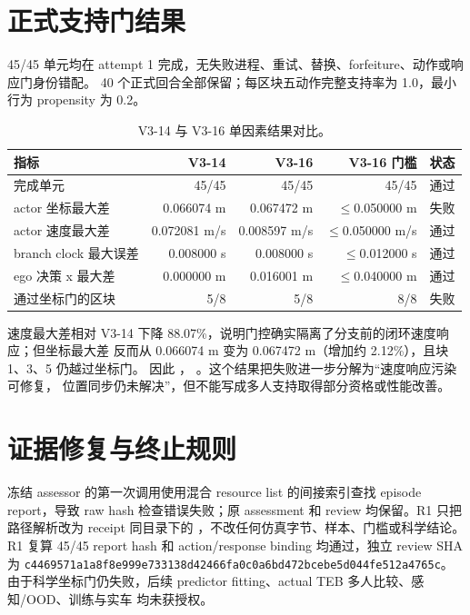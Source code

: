 \documentclass[12pt,a4paper,oneside]{report}
\newcommand{\ok}{\textcolor{vgreen}{通过}}
\newcommand{\fail}{\textcolor{vred}{失败}}
\newcommand{\hashbreak}[4]{\texttt{\footnotesize #1\allowbreak#2\allowbreak#3\allowbreak#4}}
\begin{document}
\section{正式支持门结果}
45/45 单元均在 attempt 1 完成，无失败进程、重试、替换、forfeiture、动作或响应门身份错配。
40 个正式回合全部保留；每区块五动作完整支持率为 1.0，最小行为 propensity 为 0.2。

\begin{table}[htbp]
\centering
\caption{V3-14 与 V3-16 单因素结果对比。}
\begin{tabular}{lrrrl}
\toprule
指标 & V3-14 & V3-16 & V3-16 门槛 & 状态\\
\midrule
完成单元 & 45/45 & 45/45 & 45/45 & \ok\\
actor 坐标最大差 & 0.066074 m & 0.067472 m & $\leq$0.050000 m & \fail\\
actor 速度最大差 & 0.072081 m/s & 0.008597 m/s & $\leq$0.050000 m/s & \ok\\
branch clock 最大误差 & 0.008000 s & 0.008000 s & $\leq$0.012000 s & \ok\\
ego 决策 x 最大差 & 0.000000 m & 0.016001 m & $\leq$0.040000 m & \ok\\
通过坐标门的区块 & 5/8 & 5/8 & 8/8 & \fail\\
\bottomrule
\end{tabular}
\label{tab:v316}
\end{table}

速度最大差相对 V3-14 下降 88.07\%，说明门控确实隔离了分支前的闭环速度响应；但坐标最大差
反而从 0.066074 m 变为 0.067472 m（增加约 2.12\%），且块 1、3、5 仍越过坐标门。
因此 ，
。这个结果把失败进一步分解为“速度响应污染可修复，
位置同步仍未解决”，但不能写成多人支持取得部分资格或性能改善。

\section{证据修复与终止规则}
冻结 assessor 的第一次调用使用混合 resource list 的间接索引查找 episode report，导致 raw hash
检查错误失败；原 assessment 和 review 均保留。R1 只把路径解析改为 receipt 同目录下的
，不改任何仿真字节、样本、门槛或科学结论。R1 复算 45/45 report
hash 和 action/response binding 均通过，独立 review SHA 为
\hashbreak{c4469571a1a8f8e9}{99e733138d42466f}{a0c0a6bd472bcebe}{5d044fe512a4765c}。
由于科学坐标门仍失败，后续 predictor fitting、actual TEB 多人比较、感知/OOD、训练与实车
均未获授权。
\end{document}
